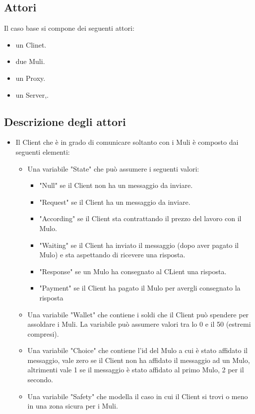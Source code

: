\documentclass[13pt,a4paper]{article}
\begin{document}
\subsection{Attori}
Il caso base si compone dei seguenti attori: 
\begin{itemize}
	\item un Clinet.
	\item due Muli.
	\item un Proxy.
	\item un Server,.
\end{itemize}

\subsection{Descrizione degli attori}
\begin{itemize}
	\item Il Client che è in grado di comunicare soltanto con i Muli è composto dai seguenti elementi:
	\begin{itemize}
		\item Una variabile "State" che può assumere i seguenti valori:
		\begin{itemize}
			\item "Null" se il Client non ha un messaggio da inviare.
			\item "Request" se il Client ha un messaggio da inviare.
			\item "According" se il Client sta contrattando il prezzo del lavoro con il Mulo.
			\item "Waiting" se il Client ha inviato il messaggio (dopo aver pagato il Mulo) e sta aspettando di ricevere una risposta.
			\item "Response" se un Mulo ha consegnato al CLient una risposta.
			\item "Payment" se il Client ha pagato il Mulo per avergli consegnato la risposta
		\end{itemize}
		\item Una variabile "Wallet" che contiene i soldi che il Client può spendere per assoldare i Muli. La variabile può assumere valori tra lo 0 e il 50 (estremi compresi).
		\item Una variabile "Choice" che contiene l'id del Mulo a cui è stato affidato il messaggio, vale zero se il Client non ha  affidato il messaggio ad un Mulo, altrimenti vale 1 se il messaggio è stato affidato al primo Mulo, 2 per il secondo.
		\item Una variabile "Safety" che modella il caso in cui il Client si trovi o meno in una zona sicura per i Muli.

\end{itemize}
\end{itemize}
\end{document}
